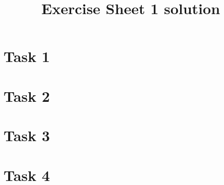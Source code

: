 \documentclass[
	11pt, 
	DIV10,
	a4paper, 
	oneside, 
	headings=normal, 
	captions=tableheading,
	final, 
	numbers=noenddot
]{scrartcl}
\title{Exercise Sheet 1 solution}
\begin{document}
\maketitle
\newpage



\section*{Task 1}

\newpage

\section*{Task 2}
\newpage

\section*{Task 3}

\newpage

\section*{Task 4}
\newpage
\end{document}
